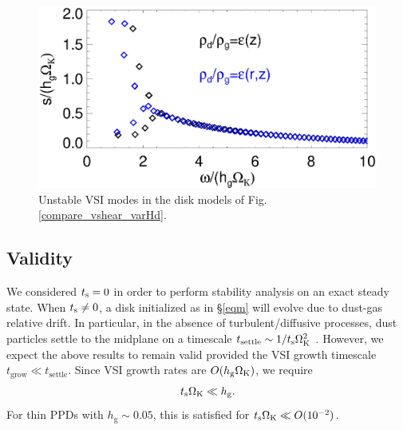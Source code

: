 \begin{figure}
  \includegraphics[width=\linewidth]{figures/compare_eigenvals_varHd} 
  \caption{Unstable VSI modes in the disk models of
    Fig. \protect\ref{compare_vshear_varHd}.  
    \label{vsi_dust_varHd}
    }
\end{figure}



\subsection{Validity}
We considered $t_\mathrm{s}=0$ in order to perform stability analysis on an
exact steady state. When $t_\mathrm{s}\neq0$, a 
disk initialized as in \S\ref{eqm} will evolve 
due to dust-gas relative drift. In particular, in the
absence of turbulent/diffusive processes, dust particles settle to the
midplane on a timescale $t_\mathrm{settle}\sim 1/t_\mathrm{s}\Omega_{\rm K}^2$
\citep{takeuchi02}. However, we expect the above results to remain
valid provided the VSI growth
timescale $t_\mathrm{grow}\ll t_\mathrm{settle}$. Since 
VSI growth rates are $O(h_\mathrm{g}\Omega_{\rm K})$, we require 
\begin{align}
  t_\mathrm{s}\Omega_{\rm K} \ll h_\mathrm{g}. 
\end{align} 
For thin PPDs with $h_\mathrm{g}\sim 0.05$, this is satisfied 
for $t_\mathrm{s}\Omega_{\rm K} \ll O(10^{-2})$.  
